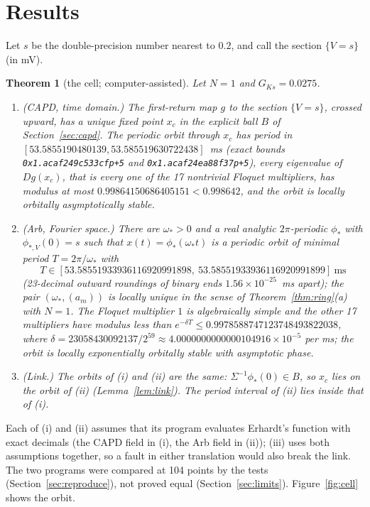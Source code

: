 \documentclass[11pt]{article}
\newtheorem{theorem}{Theorem}
\theoremstyle{definition}
\begin{document}
\section{Results}\label{sec:results}

Let $s$ be the double-precision number nearest to $0.2$, and call the section $\{V = s\}$ (in mV).

\begin{theorem}[the cell; computer-assisted]\label{thm:cell}
Let $N = 1$ and $G_{Ks} = 0.0275$.
\begin{enumerate}
\item[(i)] (CAPD, time domain.) The first-return map $g$ to the section $\{V = s\}$, crossed upward, has a unique fixed point $x_c$ in the explicit ball $B$ of Section~\ref{sec:capd}. The periodic orbit through $x_c$ has period in $[53.5855190480139, 53.585519630722438]$~ms (exact bounds \texttt{0x1.acaf249c533cfp+5} and \texttt{0x1.acaf24ea88f37p+5}), every eigenvalue of $Dg(x_c)$, that is every one of the 17 nontrivial Floquet multipliers, has modulus at most $0.99864150686405151 < 0.998642$, and the orbit is locally orbitally asymptotically stable.
\item[(ii)] (Arb, Fourier space.) There are $\omega_* > 0$ and a real analytic $2\pi$-periodic $\phi_*$ with $\phi_{*,V}(0) = s$ such that $x(t) = \phi_*(\omega_* t)$ is a periodic orbit of minimal period $T = 2\pi/\omega_*$ with
\[ T \in [53.58551933936116920991898,\ 53.58551933936116920991899]~\text{ms} \]
(23-decimal outward roundings of binary ends $1.56 \times 10^{-25}$~ms apart);
the pair $(\omega_*, (a_m))$ is locally unique in the sense of Theorem~\ref{thm:ring}(a) with $N = 1$. The Floquet multiplier $1$ is algebraically simple and the other 17 multipliers have modulus less than $e^{-\delta T} \le 0.9978588747123748493822038$, where $\delta = 23058430092137/2^{59} \approx 4.0000000000000104916 \times 10^{-5}$ per ms; the orbit is locally exponentially orbitally stable with asymptotic phase.
\item[(iii)] (Link.) The orbits of (i) and (ii) are the same: $\Sigma^{-1}\phi_*(0) \in B$, so $x_c$ lies on the orbit of (ii) (Lemma~\ref{lem:link}). The period interval of (ii) lies inside that of (i).
\end{enumerate}
\end{theorem}

Each of (i) and (ii) assumes that its program evaluates Erhardt's function with exact decimals (the CAPD field in (i), the Arb field in (ii)); (iii) uses both assumptions together, so a fault in either translation would also break the link. The two programs were compared at 104 points by the tests (Section~\ref{sec:reproduce}), not proved equal (Section~\ref{sec:limits}). Figure~\ref{fig:cell} shows the orbit.
\end{document}
